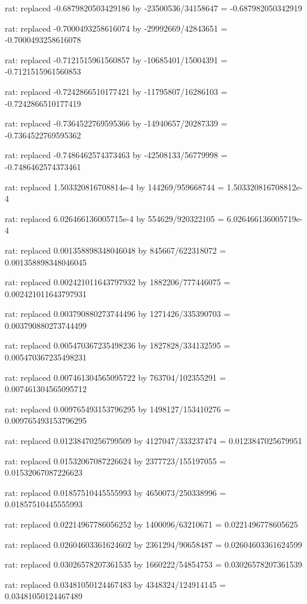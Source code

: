 \documentclass[a4paper,10pt]{article}
\begin{document}
\begin{eulernotebook}
\begin{eulercomment}
\begin{eulercomment}
\begin{eulercomment}
\begin{eulercomment}
\begin{eulercomment}
\begin{eulercomment}
\begin{eulercomment}
\begin{eulercomment}
\begin{eulercomment}
\begin{eulercomment}
\begin{eulercomment}
\begin{eulercomment}
\begin{eulercomment}
\begin{eulercomment}
\begin{eulercomment}
\begin{eulercomment}
\begin{euleroutput}
  rat: replaced -0.6879820503429186 by -23500536/34158647 = -0.687982050342919
  
  rat: replaced -0.7000493258616074 by -29992669/42843651 = -0.7000493258616078
  
  rat: replaced -0.7121515961560857 by -10685401/15004391 = -0.7121515961560853
  
  rat: replaced -0.7242866510177421 by -11795807/16286103 = -0.7242866510177419
  
  rat: replaced -0.7364522769595366 by -14940657/20287339 = -0.7364522769595362
  
  rat: replaced -0.7486462574373463 by -42508133/56779998 = -0.7486462574373461
  
  rat: replaced 1.503320816708814e-4 by 144269/959668744 = 1.503320816708812e-4
  
  rat: replaced 6.026466136005715e-4 by 554629/920322105 = 6.026466136005719e-4
  
  rat: replaced 0.001358898348046048 by 845667/622318072 = 0.001358898348046045
  
  rat: replaced 0.002421011643797932 by 1882206/777446075 = 0.002421011643797931
  
  rat: replaced 0.003790880273744496 by 1271426/335390703 = 0.003790880273744499
  
  rat: replaced 0.005470367235498236 by 1827828/334132595 = 0.005470367235498231
  
  rat: replaced 0.007461304565095722 by 763704/102355291 = 0.007461304565095712
  
  rat: replaced 0.009765493153796295 by 1498127/153410276 = 0.009765493153796295
  
  rat: replaced 0.01238470256799509 by 4127047/333237474 = 0.0123847025679951
  
  rat: replaced 0.01532067087226624 by 2377723/155197055 = 0.01532067087226623
  
  rat: replaced 0.01857510445555993 by 4650073/250338996 = 0.01857510445555993
  
  rat: replaced 0.02214967786056252 by 1400096/63210671 = 0.0221496778605625
  
  rat: replaced 0.02604603361624602 by 2361294/90658487 = 0.02604603361624599
  
  rat: replaced 0.03026578207361535 by 1660222/54854753 = 0.03026578207361539
  
  rat: replaced 0.03481050124467483 by 4348324/124914145 = 0.03481050124467489
  

\end{euleroutput}
\end{eulercomment}
\end{eulercomment}
\end{eulercomment}
\end{eulercomment}
\end{eulercomment}
\end{eulercomment}
\end{eulercomment}
\end{eulercomment}
\end{eulercomment}
\end{eulercomment}
\end{eulercomment}
\end{eulercomment}
\end{eulercomment}
\end{eulercomment}
\end{eulercomment}
\end{eulercomment}
\end{eulernotebook}
\end{document}
